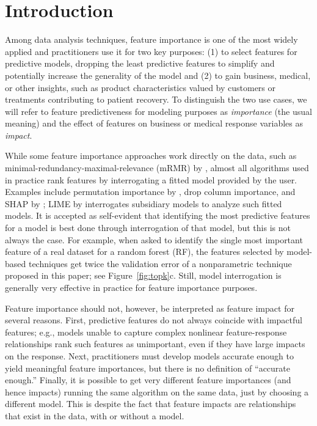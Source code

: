 \documentclass[11pt]{article}
\newcommand{\figref}[1]{Figure~\ref{#1}}
\begin{document}
\section{Introduction}
\label{sec:intro}

Among data analysis techniques, feature importance is one of the most widely applied and practitioners use it for two key purposes: (1) to select features for predictive models, dropping the least predictive features to simplify and potentially increase the generality of the model and (2) to gain business, medical, or other insights, such as product characteristics valued by customers or treatments contributing to patient recovery.  To distinguish the two use cases, we will refer to feature predictiveness for modeling purposes as {\em importance} (the usual meaning) and the effect of features on business or medical response variables as {\em impact}.

While some feature importance approaches work directly on the data, such as minimal-redundancy-maximal-relevance (mRMR) by \cite{mRMR}, almost all algorithms used in practice rank features by interrogating a fitted model provided by the user.  Examples include permutation importance by \cite{RF}, drop column importance, and SHAP by \cite{shap}; LIME by \cite{lime} interrogates subsidiary models to analyze such fitted models. It is accepted as self-evident that identifying the most predictive features for a model is best done through interrogation of that  model, but this is not always the case.  For example, when asked to identify the single most important feature of a real dataset \citep{bulldozer} for a random forest (RF), the features selected by model-based techniques get twice the validation error of a nonparametric technique proposed in this paper; see \figref{fig:topk}c. Still, model interrogation is generally very effective in practice for feature importance purposes.

Feature importance should not, however, be interpreted as feature impact for several reasons. First, predictive features do not always coincide with impactful features; e.g., models unable to capture complex nonlinear feature-response relationships rank such features as unimportant, even if they have large impacts on the response. Next, practitioners must develop models accurate enough to yield meaningful feature importances, but there is no definition of ``accurate enough.'' Finally, it is possible to get very different feature importances (and hence impacts) running the same algorithm on the same data, just by choosing a different model. This is despite the fact that feature impacts are relationships that exist in the data, with or without a model.
\end{document}
